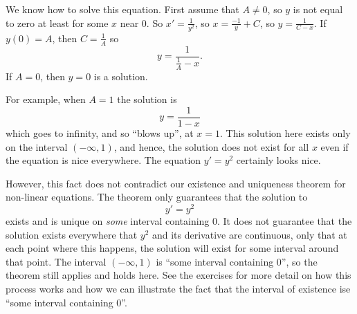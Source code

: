 \documentclass{ximera}
\begin{document}
\begin{exampleSol}
    We know how to solve this equation.  First assume that $A \not= 0$, so $y$ is not equal to zero at least for some $x$ near 0.  So $x' = \frac{1}{y^2}$, so $x = \frac{-1}{y} + C$, so $y = \frac{1}{C-x}$.  If $y(0) = A$, then $C = \frac{1}{A}$ so
    \begin{equation*}
        y = \frac{1}{\frac{1}{A} - x} .
    \end{equation*}
    If $A=0$, then $y=0$ is a solution.
    
    For example, when $A=1$ the solution is 
    \begin{equation*} 
        y = \frac{1}{1-x}
    \end{equation*}
    which goes to infinity, and so ``blows up'', at $x=1$. This solution here exists only on the interval $(-\infty, 1)$, and hence, the solution does not exist for all $x$ even if the equation is nice everywhere.  The equation $y' = y^2$ certainly looks nice. 
    
    However, this fact does not contradict our existence and uniqueness theorem for non-linear equations. The theorem only guarantees that the solution to 
    \begin{equation*} 
        y' = y^2
    \end{equation*}
    exists and is unique on \emph{some} interval containing 0. It does not guarantee that the solution exists everywhere that $y^2$ and its derivative are continuous, only that at each point where this happens, the solution will exist for some interval around that point. The interval $(-\infty, 1)$ is ``some interval containing 0'', so the theorem still applies and holds here. See the exercises for more detail on how this process works and how we can illustrate the fact that the interval of existence ise ``some interval containing 0''. 
\end{exampleSol}
\end{document}
